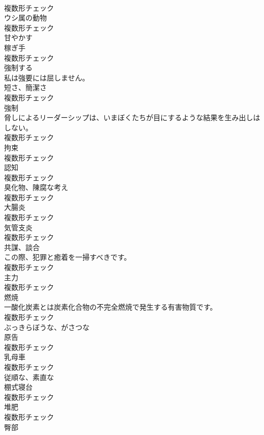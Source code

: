 \documentclass[8pt]{extreport}
\begin{document}
\begin{CJK}{UTF8}{min}
\\	複数形チェック
\\	[名詞]	ウシ属の動物	
\\	複数形チェック
\\	[動詞]	甘やかす	
\\	[名詞]	稼ぎ手	
\\	複数形チェック
\\	[動詞]	強制する	
\\	私は強要には屈しません。	
\\	[名詞]	短さ、簡潔さ	
\\	複数形チェック
\\	[名詞]	強制	
\\	脅しによるリーダーシップは、いまぼくたちが目にするような結果を生み出しはしない。	
\\	複数形チェック
\\	[名詞]	拘束	
\\	複数形チェック
\\	[名詞]	認知	
\\	複数形チェック
\\	[名詞]	臭化物、陳腐な考え	
\\	複数形チェック
\\	[名詞]	大腸炎	
\\	複数形チェック
\\	[名詞]	気管支炎	
\\	複数形チェック
\\	[名詞]	共謀、談合	
\\	この際、犯罪と癒着を一掃すべきです。	
\\	複数形チェック
\\	[名詞]	主力	
\\	複数形チェック
\\	[名詞]	燃焼	
\\	一酸化炭素とは炭素化合物の不完全燃焼で発生する有害物質です。	
\\	複数形チェック
\\	[形容詞]	ぶっきらぼうな、がさつな	
\\	[名詞]	原告	
\\	複数形チェック
\\	[名詞]	乳母車	
\\	複数形チェック
\\	[形容詞]	従順な、素直な	
\\	[名詞]	棚式寝台	
\\	複数形チェック
\\	[名詞]	堆肥	
\\	複数形チェック
\\	[名詞]	臀部	

\end{CJK}
\end{document}
